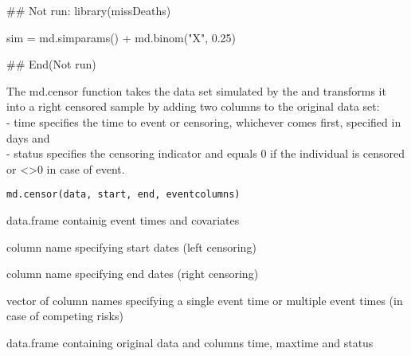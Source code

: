 \documentclass[a4paper]{book}
\begin{document}
%
\begin{Examples}
\begin{ExampleCode}

## Not run: 
library(missDeaths)

sim = md.simparams() +
   md.binom("X", 0.25)

## End(Not run)

\end{ExampleCode}
\end{Examples}
%
\begin{Description}\relax
The md.censor function takes the data set simulated by the  and transforms it into 
a right censored sample by adding two columns to the original data set:\\{}
- time specifies the time to event or censoring, whichever comes first, specified in days and \\{}
- status specifies the censoring indicator and equals 0 if the individual is censored or <>0 in case of event.
\end{Description}
%
\begin{Usage}
\begin{verbatim}
md.censor(data, start, end, eventcolumns)
\end{verbatim}
\end{Usage}
%
\begin{Arguments}
\begin{ldescription}
\item[\code{data}] data.frame containig event times and covariates

\item[\code{start}] column name specifying start dates (left censoring)

\item[\code{end}] column name specifying end dates (right censoring)

\item[\code{eventcolumns}] vector of column names specifying a single event time or multiple event times (in case of competing risks)
\end{ldescription}
\end{Arguments}
%
\begin{Value}
data.frame containing original data and columns time, maxtime and status
\end{Value}
%
\end{document}
